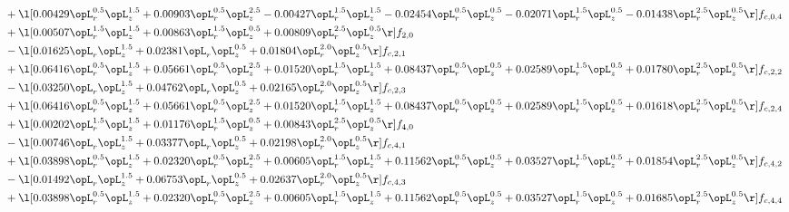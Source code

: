 \begin{alignat}{2}
& + \l[  0.00429 \opL_r^{0.5} \opL_z^{1.5} +  0.00903 \opL_r^{0.5} \opL_z^{2.5}   -0.00427 \opL_r^{1.5} \opL_z^{1.5}   -0.02454 \opL_r^{0.5} \opL_z^{0.5}   -0.02071 \opL_r^{1.5} \opL_z^{0.5}   -0.01438 \opL_r^{2.5} \opL_z^{0.5}  \r] f_{c,0,4} \nonumber \\ 
& + \l[  0.00507 \opL_r^{1.5} \opL_z^{1.5} +  0.00863 \opL_r^{1.5} \opL_z^{0.5} +  0.00809 \opL_r^{2.5} \opL_z^{0.5}  \r] f_{2,0} \nonumber \\ 
& - \l[  0.01625 \opL_r \opL_z^{1.5} +  0.02381 \opL_r \opL_z^{0.5} +  0.01804 \opL_r^{2.0} \opL_z^{0.5}  \r] f_{c,2,1} \nonumber \\ 
& + \l[  0.06416 \opL_r^{0.5} \opL_z^{1.5} +  0.05661 \opL_r^{0.5} \opL_z^{2.5} +  0.01520 \opL_r^{1.5} \opL_z^{1.5} +  0.08437 \opL_r^{0.5} \opL_z^{0.5} +  0.02589 \opL_r^{1.5} \opL_z^{0.5} +  0.01780 \opL_r^{2.5} \opL_z^{0.5}  \r] f_{c,2,2} \nonumber \\ 
& - \l[  0.03250 \opL_r \opL_z^{1.5} +  0.04762 \opL_r \opL_z^{0.5} +  0.02165 \opL_r^{2.0} \opL_z^{0.5}  \r] f_{c,2,3} \nonumber \\ 
& + \l[  0.06416 \opL_r^{0.5} \opL_z^{1.5} +  0.05661 \opL_r^{0.5} \opL_z^{2.5} +  0.01520 \opL_r^{1.5} \opL_z^{1.5} +  0.08437 \opL_r^{0.5} \opL_z^{0.5} +  0.02589 \opL_r^{1.5} \opL_z^{0.5} +  0.01618 \opL_r^{2.5} \opL_z^{0.5}  \r] f_{c,2,4} \nonumber \\ 
& + \l[  0.00202 \opL_r^{1.5} \opL_z^{1.5} +  0.01176 \opL_r^{1.5} \opL_z^{0.5} +  0.00843 \opL_r^{2.5} \opL_z^{0.5}  \r] f_{4,0} \nonumber \\ 
& - \l[  0.00746 \opL_r \opL_z^{1.5} +  0.03377 \opL_r \opL_z^{0.5} +  0.02198 \opL_r^{2.0} \opL_z^{0.5}  \r] f_{c,4,1} \nonumber \\ 
& + \l[  0.03898 \opL_r^{0.5} \opL_z^{1.5} +  0.02320 \opL_r^{0.5} \opL_z^{2.5} +  0.00605 \opL_r^{1.5} \opL_z^{1.5} +  0.11562 \opL_r^{0.5} \opL_z^{0.5} +  0.03527 \opL_r^{1.5} \opL_z^{0.5} +  0.01854 \opL_r^{2.5} \opL_z^{0.5}  \r] f_{c,4,2} \nonumber \\ 
& - \l[  0.01492 \opL_r \opL_z^{1.5} +  0.06753 \opL_r \opL_z^{0.5} +  0.02637 \opL_r^{2.0} \opL_z^{0.5}  \r] f_{c,4,3} \nonumber \\ 
& + \l[  0.03898 \opL_r^{0.5} \opL_z^{1.5} +  0.02320 \opL_r^{0.5} \opL_z^{2.5} +  0.00605 \opL_r^{1.5} \opL_z^{1.5} +  0.11562 \opL_r^{0.5} \opL_z^{0.5} +  0.03527 \opL_r^{1.5} \opL_z^{0.5} +  0.01685 \opL_r^{2.5} \opL_z^{0.5}  \r] f_{c,4,4} \nonumber \\ 
\end{alignat} 



